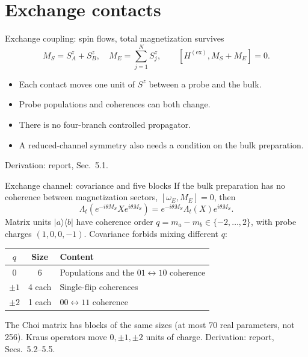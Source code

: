 \documentclass[aspectratio=169,11pt]{beamer}
\newcommand{\ket}[1]{\lvert #1\rangle}
\newcommand{\bra}[1]{\langle #1\rvert}
\newcommand{\ex}{\mathrm{ex}}
\newcommand{\report}[1]{{\color{muted}\footnotesize Derivation: report, #1.}}
\begin{document}
\section{Exchange contacts}

\begin{frame}{Exchange coupling: spin flows, total magnetization survives}
\[
M_S=S_A^z+S_B^z,\quad M_E=\sum_{j=1}^NS_j^z,\qquad
[H^{(\ex)},M_S+M_E]=0.
\]
\begin{itemize}\setlength\itemsep{8pt}
\item Each contact moves one unit of $S^z$ between a probe and the bulk.
\item Probe populations and coherences can both change.
\item There is no four-branch controlled propagator.
\item A reduced-channel symmetry also needs a condition on the bulk
preparation.
\end{itemize}
\report{Sec.~5.1}
\end{frame}

\begin{frame}{Exchange channel: covariance and five blocks}
If the bulk preparation has no coherence between magnetization sectors,
$[\omega_E,M_E]=0$, then
\[
\boxed{\Lambda_t(e^{-i\theta M_S}Xe^{i\theta M_S})
=e^{-i\theta M_S}\Lambda_t(X)e^{i\theta M_S}.}
\]
Matrix units $\ket a\bra b$ have coherence order $q=m_a-m_b\in\{-2,\dots,2\}$,
with probe charges $(1,0,0,-1)$. Covariance forbids mixing different $q$:
\begin{center}
\small
\begin{tabular}{@{}ccl@{}}
\toprule
$q$&Size&Content\\\midrule
$0$&6&Populations and the $01\leftrightarrow10$ coherence\\
$\pm1$&4 each&Single-flip coherences\\
$\pm2$&1 each&$00\leftrightarrow11$ coherence\\\bottomrule
\end{tabular}
\end{center}
The Choi matrix has blocks of the same sizes (at most 70 real parameters,
not 256). Kraus operators move $0,\pm1,\pm2$ units of charge.
\report{Secs.~5.2--5.5}
\end{frame}
\end{document}
